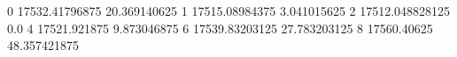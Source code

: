 0 17532.41796875 20.369140625
1 17515.08984375 3.041015625
2 17512.048828125 0.0
4 17521.921875 9.873046875
6 17539.83203125 27.783203125
8 17560.40625 48.357421875
